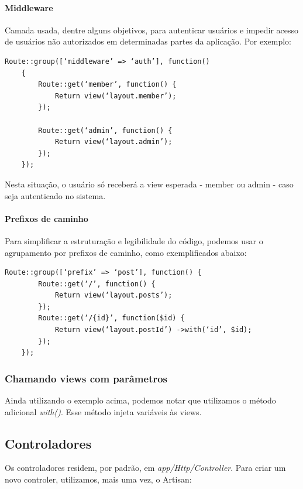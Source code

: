 \documentclass[
12pt,				%
openany,			%
twoside,			%
a4paper,			%
english,			%
french,				%
spanish,			%
brazil,				%
]{abntex2}
\begin{document}
\paragraph{Middleware}
Camada usada, dentre alguns objetivos, para autenticar usuários e impedir acesso
de usuários não autorizados em determinadas partes da aplicação. Por exemplo:

\begin{lstlisting}[style=php,caption={Grupo de middleware}]
    Route::group([‘middleware’ => ‘auth’], function()
    {
        Route::get(‘member’, function() {
            Return view(‘layout.member’);
        });

        Route::get(‘admin’, function() {
            Return view(‘layout.admin’);
        });
    });
\end{lstlisting}

Nesta situação, o usuário só receberá a view esperada - member ou admin - caso seja autenticado no sistema.


\paragraph{Prefixos de caminho}

Para simplificar a estruturação e legibilidade do código, podemos usar o agrupamento por prefixos de caminho, como exemplificados abaixo:

\begin{lstlisting}[style=php,caption={Prefixos de caminho}]
    Route::group([‘prefix’ => ‘post’], function() {
        Route::get(‘/’, function() {
            Return view(‘layout.posts’);
        });
        Route::get(‘/{id}’, function($id) {
            Return view(‘layout.postId’) ->with(‘id’, $id);
        });
    });
\end{lstlisting}

\subsubsection{Chamando views com parâmetros}

Ainda utilizando o exemplo acima, podemos notar que utilizamos o método adicional \textit{with()}. Esse método injeta variáveis às views.

\subsection{Controladores}

Os controladores residem, por padrão, em \textit{app/Http/Controller}. Para criar um novo controler, utilizamos, mais uma vez, o Artisan:
\end{document}
